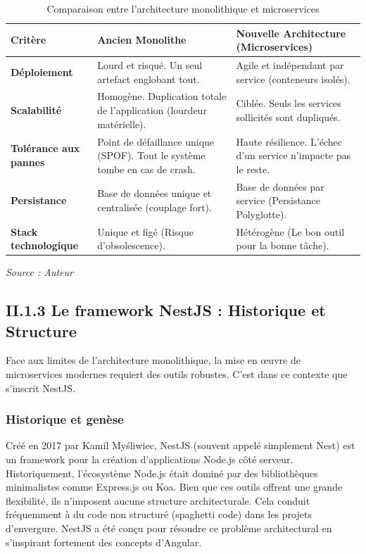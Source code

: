 \begin{table}[htbp]
    \centering
    \renewcommand{\arraystretch}{1.3}
    \begin{tabular}{|p{3.5cm}|p{5cm}|p{5cm}|}
        \hline
        \textbf{Critère} & \textbf{Ancien Monolithe} & \textbf{Nouvelle Architecture (Microservices)} \\
        \hline
        \textbf{Déploiement} & Lourd et risqué. Un seul artefact englobant tout. & Agile et indépendant par service (conteneurs isolés). \\
        \hline
        \textbf{Scalabilité} & Homogène. Duplication totale de l'application (lourdeur matérielle). & Ciblée. Seuls les services sollicités sont dupliqués. \\
        \hline
        \textbf{Tolérance aux pannes} & Point de défaillance unique (SPOF). Tout le système tombe en cas de crash. & Haute résilience. L'échec d'un service n'impacte pas le reste. \\
        \hline
        \textbf{Persistance} & Base de données unique et centralisée (couplage fort). & Base de données par service (Persistance Polyglotte). \\
        \hline
        \textbf{Stack technologique} & Unique et figé (Risque d'obsolescence). & Hétérogène (Le bon outil pour la bonne tâche). \\
        \hline
    \end{tabular}
    \caption{Comparaison entre l'architecture monolithique et microservices}
    \vspace{0.2cm}\small\textit{Source : Auteur}
    \label{tab:monolith_vs_microservices}
\end{table}

\subsection{II.1.3 Le framework NestJS : Historique et Structure}
Face aux limites de l'architecture monolithique, la mise en œuvre de microservices modernes requiert des outils robustes. C'est dans ce contexte que s'inscrit NestJS.

\subsubsection{Historique et genèse}
Créé en 2017 par Kamil Myśliwiec, NestJS (souvent appelé simplement Nest) est un framework pour la création d'applications Node.js côté serveur. Historiquement, l'écosystème Node.js était dominé par des bibliothèques minimalistes comme Express.js ou Koa. Bien que ces outils offrent une grande flexibilité, ils n'imposent aucune structure architecturale. Cela conduit fréquemment à du code non structuré (spaghetti code) dans les projets d'envergure. NestJS a été conçu pour résoudre ce problème architectural en s'inspirant fortement des concepts d'Angular.

